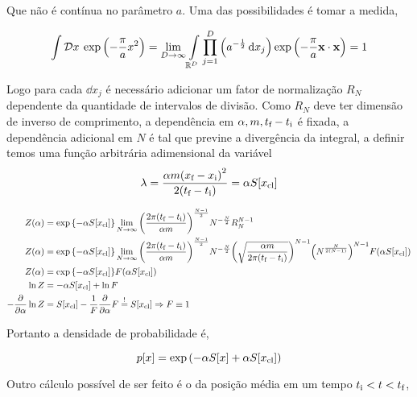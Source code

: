 \documentclass[twoside]{amsart}
\newcommand{\Dd}[1]{\mathcal D #1\: }
\numberwithin{equation}{section}
\begin{document}
Que não é contínua no parâmetro $a$. Uma das possibilidades é tomar a medida,

\begin{align*}
    \int\Dd{x}\exp\qty(-\frac\pi ax^2)=\lim\limits_{D\rightarrow \infty}\int\limits_{{\mathbb R}^D}\prod\limits_{j=1}^D\qty(a^{-\frac12}\dd{x_j})\exp\qty(- \frac\pi a\vb x\cdot\vb x)=1   
\end{align*}

Logo para cada $\dd{x_j}$ é necessário adicionar um fator de normalização $R_N$ dependente da quantidade 
de intervalos de divisão. Como $R_N$ deve ter dimensão de inverso de comprimento, a dependência em $\alpha, m, t_{\textnormal f}-t_{\textnormal i}$ é fixada, 
a dependência adicional em $N$ é tal que previne a divergência da integral, a definir temos uma função arbitrária 
adimensional da variável $$\lambda = \frac{\alpha m\qty(x_{\textnormal f}-x_{\textnormal i})^2}{2\qty(t_{\textnormal f}-t_{\textnormal i})}=\alpha S\qty[x_{\textnormal{cl}}]$$

\begin{align*}
    Z\qty(\alpha)&=\exp\qty{-\alpha S\qty[x_{\textnormal{cl}}]}\lim\limits_{N\rightarrow \infty}\qty(\frac{2\pi\qty(t_{\textnormal f}-t_{\textnormal i})}{\alpha m})^{\frac{N-1}{2}}N^{-\frac N2}R^{N-1}_N\\
    Z\qty(\alpha)&=\exp\qty{-\alpha S\qty[x_{\textnormal{cl}}]}\lim\limits_{N\rightarrow \infty}\qty(\frac{2\pi\qty(t_{\textnormal f}-t_{\textnormal i})}{\alpha m})^{\frac{N-1}{2}}N^{-\frac N2}\qty(\sqrt{\frac{\alpha m}{2\pi\qty(t_{\textnormal f}-t_{\textnormal i})}})^{N-1}\qty(N^{\frac{N}{2\qty(N-1)}})^{N-1}F\qty(\alpha S\qty[x_{\textnormal{cl}}])\\
    Z\qty(\alpha)&=\exp\qty{-\alpha S\qty[x_{\textnormal{cl}}]}F\qty(\alpha S\qty[x_{\textnormal {cl}}])\\
    \ln Z&=-\alpha S\qty[x_{\textnormal{cl}}]+\ln F\\
    -\pdv{}{\alpha}\ln Z&=S\qty[x_{\textnormal{cl}}]-\frac{1}{F}\pdv{}{\alpha}F \buildrel!\over=S\qty[x_{\textnormal{cl}}]\Rightarrow F\equiv 1
\end{align*}

Portanto a densidade de probabilidade é,

$$p\qty[x]=\exp\qty(-\alpha S\qty[x]+\alpha S\qty[x_{\textnormal{cl}}])$$

Outro cálculo possível de ser feito é o da posição média em um tempo $t_{\textnormal i}<t<t_{\textnormal f}$,
\end{document}
